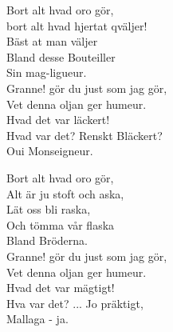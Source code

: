 \vspace{10pt}
Bort alt hvad oro gör,\\
bort alt hvad hjertat qväljer!\\
Bäst at man väljer\\
Bland desse Bouteiller\\
Sin mag-ligueur.\\
\revrpt Granne! gör du just som jag gör,\\
Vet denna oljan ger humeur.\\
Hvad det var läckert!\\
Hvad var det? Renskt Bläckert?\\
	Oui Monseigneur.\rpt\par
\vspace{10pt}
Bort alt hvad oro gör,\\
Alt är ju stoft och aska,\\
Lät oss bli raska,\\
Och tömma vår flaska\\
Bland Bröderna.\\
\revrpt Granne! gör du just som jag gör,\\
Vet denna oljan ger humeur.\\
Hvad det var mägtigt!\\
Hva var det? ... Jo präktigt,\\
	Mallaga - ja.\rpt
